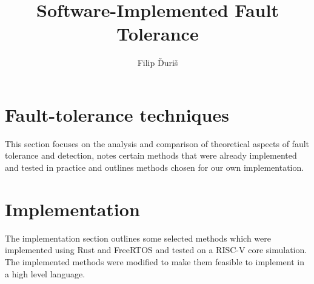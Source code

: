 \documentclass[12pt, letterpaper]{article}
\title{
    \Huge \textbf{Software-Implemented Fault Tolerance}
}
\author{Filip Ďuriš}
\begin{document}
 


% 


\newpage


\newpage





\tableofcontents
\newpage

\printnoidxglossaries
\newpage


\newpage




\newpage



\section{Fault-tolerance techniques}

This section focuses on the analysis and comparison of theoretical aspects of fault tolerance and detection, notes certain methods that were already implemented and tested in practice and outlines methods chosen for our own implementation.







\clearpage


\newpage


\clearpage

\clearpage
\section{Implementation}

The implementation section outlines some selected methods which were implemented using Rust and FreeRTOS and tested on a RISC-V core simulation. The implemented methods were modified to make them feasible to implement in a high level language.


\clearpage


\clearpage


\clearpage
\end{document}
